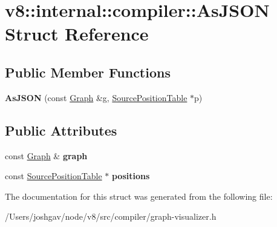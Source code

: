 \hypertarget{structv8_1_1internal_1_1compiler_1_1_as_j_s_o_n}{}\section{v8\+:\+:internal\+:\+:compiler\+:\+:As\+J\+S\+ON Struct Reference}
\label{structv8_1_1internal_1_1compiler_1_1_as_j_s_o_n}
\subsection*{Public Member Functions}
\begin{DoxyCompactItemize}
\item 
{\bfseries As\+J\+S\+ON} (const \hyperlink{classv8_1_1internal_1_1compiler_1_1_graph}{Graph} \&g, \hyperlink{classv8_1_1internal_1_1compiler_1_1_source_position_table}{Source\+Position\+Table} $\ast$p)\hypertarget{structv8_1_1internal_1_1compiler_1_1_as_j_s_o_n_a1c90105bfa77d90bdea7e407249398f7}{}\label{structv8_1_1internal_1_1compiler_1_1_as_j_s_o_n_a1c90105bfa77d90bdea7e407249398f7}

\end{DoxyCompactItemize}
\subsection*{Public Attributes}
\begin{DoxyCompactItemize}
\item 
const \hyperlink{classv8_1_1internal_1_1compiler_1_1_graph}{Graph} \& {\bfseries graph}\hypertarget{structv8_1_1internal_1_1compiler_1_1_as_j_s_o_n_a443b665ba2ef21fbf653f5839265a084}{}\label{structv8_1_1internal_1_1compiler_1_1_as_j_s_o_n_a443b665ba2ef21fbf653f5839265a084}

\item 
const \hyperlink{classv8_1_1internal_1_1compiler_1_1_source_position_table}{Source\+Position\+Table} $\ast$ {\bfseries positions}\hypertarget{structv8_1_1internal_1_1compiler_1_1_as_j_s_o_n_a3d3a100e79ab0cd73dcca9d7c1bd3f26}{}\label{structv8_1_1internal_1_1compiler_1_1_as_j_s_o_n_a3d3a100e79ab0cd73dcca9d7c1bd3f26}

\end{DoxyCompactItemize}


The documentation for this struct was generated from the following file\+:\begin{DoxyCompactItemize}
\item 
/\+Users/joshgav/node/v8/src/compiler/graph-\/visualizer.\+h\end{DoxyCompactItemize}
